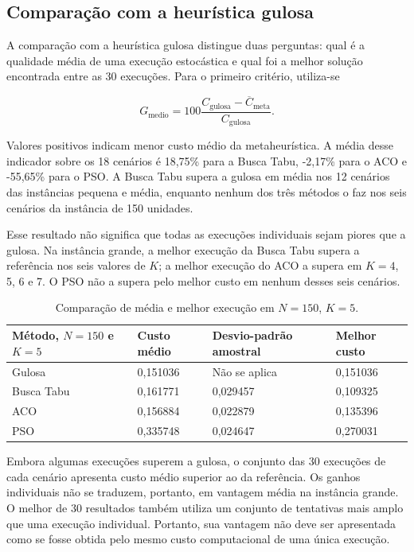 \documentclass[12pt,a4paper]{article}
\begin{document}
\subsection{Comparação com a heurística gulosa}
\label{subsec:comparacao-gulosa}

A comparação com a heurística gulosa distingue duas perguntas: qual é a qualidade média
de uma execução estocástica e qual foi a melhor solução encontrada entre as 30
execuções. Para o primeiro critério, utiliza-se

\[
G_{\mathrm{medio}}=100\frac{C_{\mathrm{gulosa}}-\overline C_{\mathrm{meta}}}{C_{\mathrm{gulosa}}}.
\]

Valores positivos indicam menor custo médio da metaheurística. A média desse indicador
sobre os 18 cenários é 18,75\% para a Busca Tabu, -2,17\% para o ACO e -55,65\% para o
PSO. A Busca Tabu supera a gulosa em média nos 12 cenários das instâncias pequena e
média, enquanto nenhum dos três métodos o faz nos seis cenários da instância de 150
unidades.

Esse resultado não significa que todas as execuções individuais sejam piores que a
gulosa. Na instância grande, a melhor execução da Busca Tabu supera a referência nos
seis valores de $K$; a melhor execução do ACO a supera em $K=4$, 5, 6 e 7. O PSO não a
supera pelo melhor custo em nenhum desses seis cenários.

\begin{table}[htbp]
\centering\small
\caption{Comparação de média e melhor execução em $N=150$, $K=5$.}
\label{tab:gulosa-k5}
\begin{tabularx}{\textwidth}{YYYY}
\toprule
Método, $N=150$ e $K=5$ & Custo médio & Desvio-padrão amostral & Melhor custo \\
\midrule
Gulosa & 0,151036 & Não se aplica & 0,151036 \\
Busca Tabu & 0,161771 & 0,029457 & 0,109325 \\
ACO & 0,156884 & 0,022879 & 0,135396 \\
PSO & 0,335748 & 0,024647 & 0,270031 \\
\bottomrule
\end{tabularx}
\end{table}

Embora algumas execuções superem a gulosa, o conjunto das 30 execuções de cada cenário
apresenta custo médio superior ao da referência. Os ganhos individuais não se traduzem,
portanto, em vantagem média na instância grande. O melhor de 30 resultados também
utiliza um conjunto de tentativas mais amplo que uma execução individual. Portanto, sua
vantagem não deve ser apresentada como se fosse obtida pelo mesmo custo computacional de
uma única execução.
\end{document}
